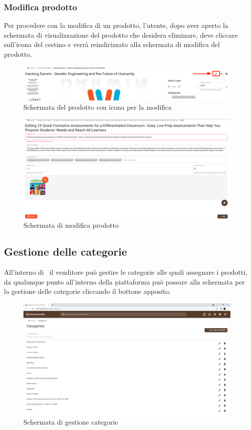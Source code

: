 \subsubsection{Modifica prodotto}
Per procedere con la modifica di un prodotto, l'utente, dopo aver aperto la schermata di visualizzazione del prodotto che desidera eliminare, deve cliccare sull'icona del cestino e verrà reindirizzato alla schermata di modifica del prodotto.
\begin{figure}[H]
	\centering
	\includegraphics[scale=0.25]{Immagini/Venditore/pdp.sellermodify.png}
	\caption{Schermata del prodotto con icona per la modifica}
	\label{fig:ModificaP}
\end{figure}
\begin{figure}[H]
	\centering
	\includegraphics[scale=0.25]{Immagini/Venditore/pdp-edit.seller.png}
	\caption{Schermata di modifica prodotto}
	\label{fig:ModificaProdotto}
\end{figure}
\subsection{Gestione delle categorie}\label{categorie}
All'interno di \NomeProgetto\ il venditore può gestire le categorie alle quali assegnare i prodotti, da qualunque punto all'interno della piattaforma può passare alla schermata per la gestione delle categorie cliccando il bottone apposito.
\begin{figure}[H]
	\centering
	\includegraphics[scale=0.4]{Immagini/Venditore/categories.png}
	\caption{Schermata di gestione categorie}
	\label{fig:GestioneCategorie}
\end{figure}
